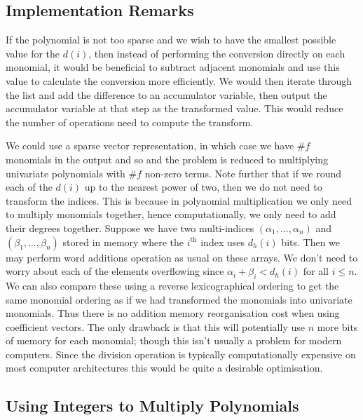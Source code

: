 \subsection{Implementation Remarks}
\label{sub:implementation-kronecker}

If the polynomial is not too sparse and we wish to have the smallest possible value for the $d(i)$, then instead of performing the conversion directly on each monomial, it would be beneficial to subtract adjacent monomials and use this value to calculate the conversion more efficiently. We would then iterate through the list and add the difference to an accumulator variable, then output the accumulator variable at that step as the transformed value. This would reduce the number of operations need to compute the transform.

We could use a sparse vector representation, in which case we have $\# f$ monomials in the output and so and the problem is reduced to multiplying univariate polynomials with $\# f$ non-zero terms. Note further that if we round each of the $d(i)$ up to the nearest power of two, then we do not need to transform the indices. This is because in polynomial multiplication we only need to multiply monomials together, hence computationally, we only need to add their degrees together. Suppose we have two multi-indices $(\alpha_1, \ldots, \alpha_n)$ and $(\beta_1, \ldots, \beta_n)$ stored in memory where the $i^{\text{th}}$ index uses $d_h(i)$ bits. Then we may perform word additions operation as usual on these arrays. We don't need to worry about each of the elements overflowing since $\alpha_i + \beta_i < d_h(i)$ for all $i \le n$. We can also compare these using a reverse lexicographical ordering to get the same monomial ordering as if we had transformed the monomials into univariate monomials. Thus there is no addition memory reorganisation cost when using coefficient vectors. The only drawback is that this will potentially use $n$ more bits of memory for each monomial; though this isn't usually a problem for modern computers. Since the division operation is typically computationally expensive on most computer architectures \cite{instruction-times} this would be quite a desirable optimisation.

\medskip

\subsection{Using Integers to Multiply Polynomials}%
\label{sub:integers-for-poly-mult}

